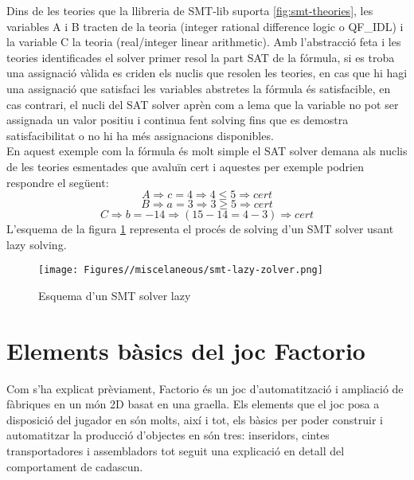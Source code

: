 Dins de les teories que la llibreria de SMT-lib suporta \ref{fig:smt-theories}, les variables A i B tracten de la teoria (integer rational difference logic o QF\_IDL) i la variable C la teoria (real/integer linear arithmetic). Amb l'abstracció feta i les teories identificades el solver primer resol la part SAT de la fórmula, si es troba una assignació vàlida es criden els nuclis que resolen les teories, en cas que hi hagi una assignació que satisfaci les variables abstretes la fórmula és satisfacible, en cas contrari, el nucli del SAT solver aprèn com a lema que la variable no pot ser assignada un valor positiu i continua fent solving fins que es demostra satisfacibilitat o no hi ha més assignacions disponibles.\\
En aquest exemple com la fórmula és molt simple el SAT solver demana als nuclis de les teories esmentades que avaluïn cert i aquestes per exemple podrien respondre el següent:
$$ A \Rightarrow c=4 \Rightarrow 4\le5 \Rightarrow cert $$
$$ B \Rightarrow a=3 \Rightarrow 3\geq5 \Rightarrow cert $$
$$ C \Rightarrow b=-14 \Rightarrow (15-14=4-3) \Rightarrow cert $$
L'esquema de la figura \ref{fig:smt-solver-lazy} representa el procés de solving d'un SMT solver usant lazy solving.
\begin{figure}[H]
    \centering
    \texttt{[image: Figures//miscelaneous/smt-lazy-zolver.png]}
    \caption{Esquema d'un SMT solver lazy \cite{SMT-solving}}
    \label{fig:smt-solver-lazy}
\end{figure}

\section{Elements bàsics del joc Factorio}
Com s'ha explicat prèviament, Factorio és un joc d'automatització i ampliació de fàbriques en un món 2D basat en una graella. Els elements que el joc posa a disposició del jugador en són molts, així i tot, els bàsics per poder construir i automatitzar la producció d'objectes en són tres: inseridors, cintes transportadores i assembladors tot seguit una explicació en detall del comportament de cadascun.

